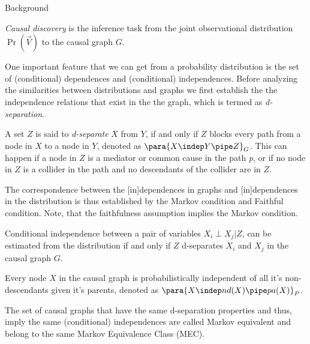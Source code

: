 \documentclass[10pt]{article}
\begin{document}
\begin{psection}[2]{Background}
    \begin{definition}
        \textit{Causal discovery} is the inference task from the joint observational
        distribution $\Pr{(\vec{V})}$ to the causal graph $G$.
    \end{definition}

    One important feature that we can get from a probability distribution is the set of
    (conditional) dependences and (conditional) independences. Before analyzing the
    similarities between distributions and graphs we first establish the the
    independence relations that exist in the the graph, which is termed as
    \textit{d-separation}.

    \begin{definition}
        A set $Z$ is said to \textit{d-separate} $X$ from $Y$, if and only if $Z$ blocks
        every path from a node in $X$ to a node in $Y$, denoted as
        $\para{X \indep Y \pipe Z}_{G}$. This can happen if a node in $Z$ is a mediator
        or common cause in the path \textit{p}, or if no node in $Z$ is a collider in
        the path and no descendants of the collider are in $Z$.   
    \end{definition}

    The correspondence between the [in]dependences in graphs and [in]dependences in the
    distribution  is thus established by the Markov condition and Faithful condition.
    Note, that the faithfulness assumption implies the Markov condition. 
    \begin{definition}
        Conditional independence between a pair of variables $X_i \perp X_j \vert Z$,
        can be estimated from the distribution if and only if $Z$ d-separates $X_i$ and
        $X_j$ in the causal graph $G$. 
    \end{definition}

    \begin{definition}
        Every node $X$ in the causal graph is probabilistically independent of all it's
        non-descendants given it's parents, denoted as
        $\para{X \indep nd(X) \pipe pa(X)}_{P}$. 
    \end{definition}

    \begin{definition} 
        The set of causal graphs that have the same d-separation properties and thus,
        imply the same (conditional) independences are called Markov equivalent and
        belong to the same Markov Equivalence Class (MEC). 
    \end{definition}


\end{psection}
\end{document}
